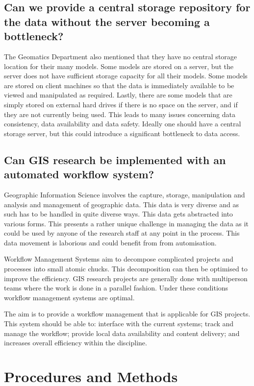 \documentclass[12pt,a4paper]{article}
\begin{document}
\subsection{Can we provide a central storage repository for the data without the server becoming a bottleneck?}
The Geomatics Department also mentioned that they have no central
storage location for their many models. Some models are stored on
a server, but the server does not have sufficient storage capacity
for all their models. Some models are stored on client machines so
that the data is immediately available to be viewed and manipulated
as required. Lastly, there are some models that are simply stored on
external hard drives if there is no space on the server, and if they
are not currently being used. This leads to many issues concerning
data consistency, data availability and data safety. Ideally one should
have a central storage server, but this could introduce a significant
bottleneck to data access.
\subsection{Can GIS research be implemented with an automated workflow system?}
Geographic Information Science involves the capture, storage, manipulation and analysis
and management of geographic data. This data is very diverse and as such has to be handled
in quite diverse ways. This data gets abstracted into various forms. This presents a
rather unique challenge in managing the data as it could be used by anyone of the research
staff at any point in the process. This data movement is laborious and could benefit from
from automisation.

Workflow Management Systems aim to decompose complicated projects and processes into
small atomic chucks. This decomposition can then be optimised to improve the efficiency.
GIS research projects are generally done with multiperson teams where the work is
done in a parallel fashion. Under these conditions workflow management systems
are optimal.

The aim is to provide a workflow management that is applicable for GIS projects.
This system should be able to: interface with the current systems; track and
manage the workflow; provide local data availability and content delivery; and
increases overall efficiency within the discipline.

\section{Procedures and Methods}
\end{document}
